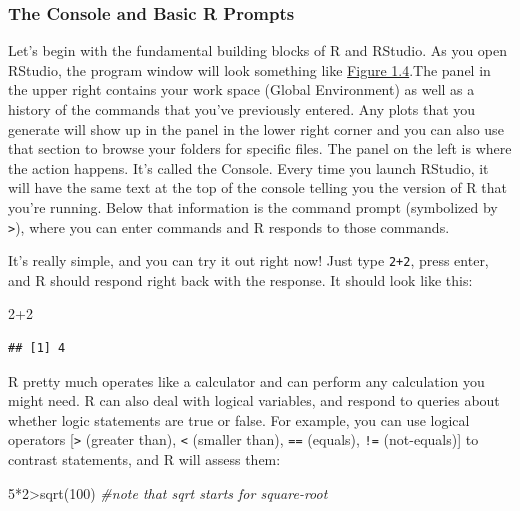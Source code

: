 \documentclass[
]{book}
\newenvironment{Shaded}{\begin{snugshade}}{\end{snugshade}}
\newcommand{\CommentTok}[1]{\textcolor[rgb]{0.56,0.35,0.01}{\textit{#1}}}
\newcommand{\DecValTok}[1]{\textcolor[rgb]{0.00,0.00,0.81}{#1}}
\newcommand{\FunctionTok}[1]{\textcolor[rgb]{0.00,0.00,0.00}{#1}}
\newcommand{\NormalTok}[1]{#1}
\newcommand{\SpecialCharTok}[1]{\textcolor[rgb]{0.00,0.00,0.00}{#1}}
\begin{document}
\hypertarget{the-console-and-basic-r-prompts}{%
\subsubsection*{The Console and Basic R Prompts}\label{the-console-and-basic-r-prompts}}

Let's begin with the fundamental building blocks of R and RStudio. As you open RStudio, the program window will look something like \protect\hyperlink{Fig1.4}{Figure 1.4}.The panel in the upper right contains your work space (Global Environment) as well as a history of the commands that you've previously entered. Any plots that you generate will show up in the panel in the lower right corner and you can also use that section to browse your folders for specific files. The panel on the left is where the action happens. It's called the Console. Every time you launch RStudio, it will have the same text at the top of the console telling you the version of R that you're running. Below that information is the command prompt (symbolized by \texttt{\textgreater{}}), where you can enter commands and R responds to those commands.

It's really simple, and you can try it out right now! Just type \texttt{2+2}, press enter, and R should respond right back with the response. It should look like this:

\begin{Shaded}
\begin{Highlighting}[]
\DecValTok{2}\SpecialCharTok{+}\DecValTok{2}
\end{Highlighting}
\end{Shaded}

\begin{verbatim}
## [1] 4
\end{verbatim}

R pretty much operates like a calculator and can perform any calculation you might need. R can also deal with logical variables, and respond to queries about whether logic statements are true or false. For example, you can use logical operators {[}\texttt{\textgreater{}} (greater than), \texttt{\textless{}} (smaller than), \texttt{==} (equals), \texttt{!=} (not-equals){]} to contrast statements, and R will assess them:

\begin{Shaded}
\begin{Highlighting}[]
\DecValTok{5}\SpecialCharTok{*}\DecValTok{2}\SpecialCharTok{\textgreater{}}\FunctionTok{sqrt}\NormalTok{(}\DecValTok{100}\NormalTok{) }\CommentTok{\#note that sqrt starts for square{-}root}
\end{Highlighting}
\end{Shaded}
\end{document}
